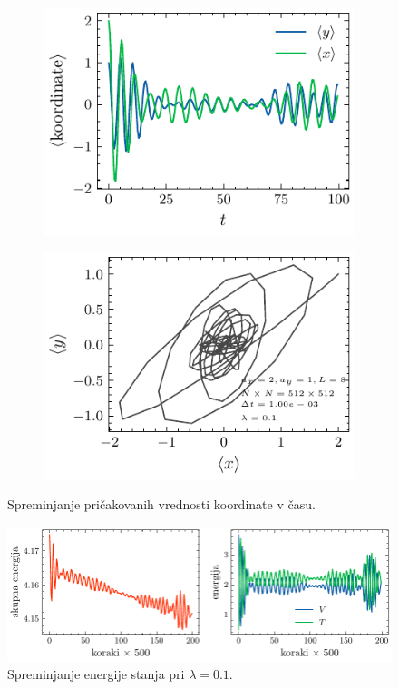 \documentclass[11pt]{report}
\begin{document}
\begin{figure}[h!]
	\centering
	\begin{subfigure}[b]{0.49\textwidth}
		\centering
		\includegraphics{xyvst.pdf}
		\caption{}
		\label{fig: 11a}
	\end{subfigure}
	\hfill
	\begin{subfigure}[b]{0.49\textwidth}
		\centering
		\includegraphics{xvsy.pdf}
		\caption{}
		\label{fig: 11b}
	\end{subfigure}
	\caption{Spreminjanje pričakovanih vrednosti koordinate v času.}
	\label{fig: 11}
\end{figure}

\newpage

\begin{figure}[h!]
	\centering
	\includegraphics[width=1\textwidth]{xy.pdf}
	\caption{Spreminjanje energije stanja pri $\lambda=0.1$.}
	\label{fig: 12}
\end{figure}
\end{document}
